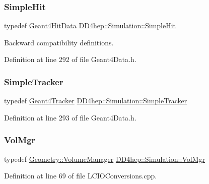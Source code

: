 \subsubsection{\texorpdfstring{Simple\+Hit}{SimpleHit}}
{\footnotesize\ttfamily typedef \hyperlink{class_d_d4hep_1_1_simulation_1_1_geant4_hit_data}{Geant4\+Hit\+Data} \hyperlink{namespace_d_d4hep_1_1_simulation_a0a561b07f32c81b4365bdc61e74e645b}{D\+D4hep\+::\+Simulation\+::\+Simple\+Hit}}



Backward compatibility definitions. 



Definition at line 292 of file Geant4\+Data.\+h.

\hypertarget{namespace_d_d4hep_1_1_simulation_aeac70046c56d692918ebee2e3cdd8c3f}{}\label{namespace_d_d4hep_1_1_simulation_aeac70046c56d692918ebee2e3cdd8c3f} 
\subsubsection{\texorpdfstring{Simple\+Tracker}{SimpleTracker}}
{\footnotesize\ttfamily typedef \hyperlink{class_d_d4hep_1_1_simulation_1_1_geant4_tracker}{Geant4\+Tracker} \hyperlink{namespace_d_d4hep_1_1_simulation_aeac70046c56d692918ebee2e3cdd8c3f}{D\+D4hep\+::\+Simulation\+::\+Simple\+Tracker}}



Definition at line 293 of file Geant4\+Data.\+h.

\hypertarget{namespace_d_d4hep_1_1_simulation_a989cbf131f431a9856bcfd4ecd78c39f}{}\label{namespace_d_d4hep_1_1_simulation_a989cbf131f431a9856bcfd4ecd78c39f} 
\subsubsection{\texorpdfstring{Vol\+Mgr}{VolMgr}}
{\footnotesize\ttfamily typedef \hyperlink{class_d_d4hep_1_1_geometry_1_1_volume_manager}{Geometry\+::\+Volume\+Manager} \hyperlink{namespace_d_d4hep_1_1_simulation_a989cbf131f431a9856bcfd4ecd78c39f}{D\+D4hep\+::\+Simulation\+::\+Vol\+Mgr}}



Definition at line 69 of file L\+C\+I\+O\+Conversions.\+cpp.



